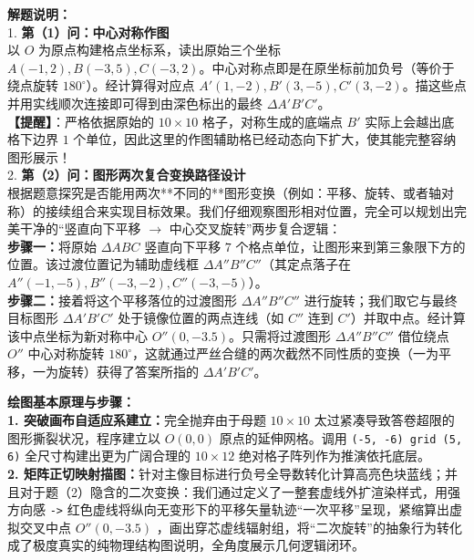 {\small\color{gray}
\textbf{解题说明：}\\
1. \textbf{第（1）问：中心对称作图}\\
以 $O$ 为原点构建格点坐标系，读出原始三个坐标 $A(-1,2), B(-3,5), C(-3,2)$。中心对称点即是在原坐标前加负号（等价于绕点旋转 $180^\circ$）。经计算得对应点 $A'(1,-2), B'(3,-5), C'(3,-2)$。描这些点并用实线顺次连接即可得到由深色标出的最终 $\Delta A'B'C'$。\\
\textbf{【提醒】}：严格依据原始的 $10\times10$ 格子，对称生成的底端点 $B'$ 实际上会越出底格下边界 $1$ 个单位，因此这里的作图辅助格已经动态向下扩大，使其能完整容纳图形展示！\\
2. \textbf{第（2）问：图形两次复合变换路径设计}\\
根据题意探究是否能用两次**不同的**图形变换（例如：平移、旋转、或者轴对称）的接续组合来实现目标效果。我们仔细观察图形相对位置，完全可以规划出完美干净的“竖直向下平移 $\rightarrow$ 中心交叉旋转”两步复合逻辑：\\
\textbf{步骤一：}将原始 $\Delta ABC$ 竖直向下平移 $7$ 个格点单位，让图形来到第三象限下方的位置。该过渡位置记为辅助虚线框 $\Delta A''B''C''$（其定点落子在 $A''(-1,-5), B''(-3,-2), C''(-3,-5)$）。\\
\textbf{步骤二：}接着将这个平移落位的过渡图形 $\Delta A''B''C''$ 进行旋转；我们取它与最终目标图形 $\Delta A'B'C'$ 处于镜像位置的两点连线（如 $C''$ 连到 $C'$）并取中点。经计算该中点坐标为新对称中心 $O''(0, -3.5)$。只需将过渡图形 $\Delta A''B''C''$ 借位绕点 $O''$ 中心对称旋转 $180^\circ$，这就通过严丝合缝的两次截然不同性质的变换（一为平移，一为旋转）获得了答案所指的 $\Delta A'B'C'$。
}

\vspace{0.6cm}

{\small\color{blue!70!black}
\textbf{绘图基本原理与步骤：}\\
\textbf{1. 突破画布自适应系建立：}完全抛弃由于母题 $10\times10$ 太过紧凑导致答卷超限的图形撕裂状况，程序建立以 $O(0,0)$ 原点的延伸网格。调用 \texttt{(-5, -6) grid (5, 6)} 全尺寸构建出更为广阔合理的 $10\times12$ 绝对格子阵列作为推演依托底层。\\
\textbf{2. 矩阵正切映射描图：}针对主像目标进行负号全导数转化计算高亮色块蓝线；并且对于题（2）隐含的二次变换：我们通过定义了一整套虚线外扩渲染样式，用强方向感 \texttt{->} 红色虚线将纵向无变形下的平移矢量轨迹“一次平移”呈现，紧缩算出虚拟交叉中点 $O''(0, -3.5)$ ，画出穿芯虚线辐射组，将“二次旋转”的抽象行为转化成了极度真实的纯物理结构图说明，全角度展示几何逻辑闭环。
}



